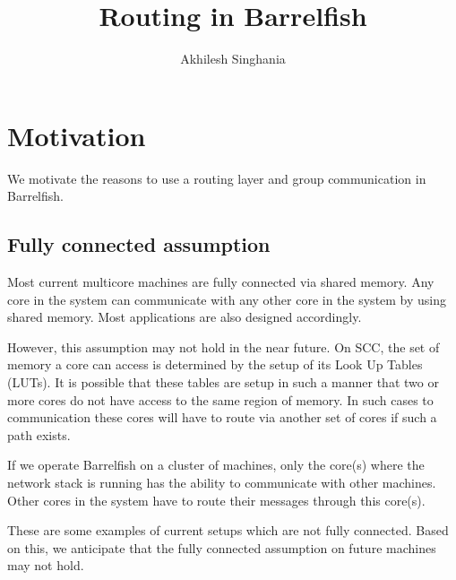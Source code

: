 \documentclass[a4paper,twoside]{report} %
\title{Routing in Barrelfish}   %
\author{Akhilesh Singhania}	%
\begin{document}
\maketitle

%
%
\begin{versionhistory}
\end{versionhistory}


\chapter{Motivation}

We motivate the reasons to use a routing layer and group communication in Barrelfish.

\section{Fully connected assumption}
Most current multicore machines are fully connected via shared memory.
Any core in the system can communicate with any other core in the system
by using shared memory.
Most applications are also designed accordingly.

However, this assumption may not hold in the near future.
On SCC, the set of memory a core can access is determined by the setup of its
Look Up Tables (LUTs).
It is possible that these tables are setup in such a manner that
two or more cores do not have access to the same region of memory.
In such cases to communication these cores will have to route
via another set of cores if such a path exists.

If we operate Barrelfish on a cluster of machines,
only the core(s) where the network stack is running
has the ability to communicate with other machines.
Other cores in the system have to route their messages through this core(s).

These are some examples of current setups which are not fully connected.
Based on this, we anticipate that the fully connected assumption
on future machines may not hold.
\end{document}
